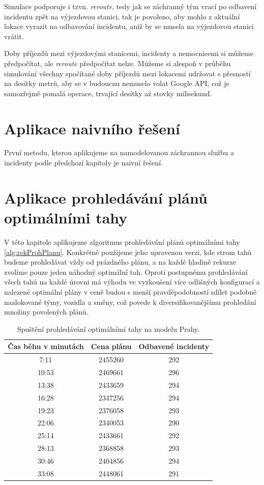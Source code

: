 Simulace podporuje i tzvn. \textit{reroute}, tedy jak se záchranný tým vrací po odbavení incidentu zpět na výjezdovou stanici,
tak je povoleno, aby mohlo z aktuální lokace vyrazit na odbavování incidentu, aniž by se musela na výjezdovou stanici vrátit.

Doby příjezdů mezi výjezdovými stanicemi, incidenty a nemocnicemi si můžeme předpočítat, ale \textit{reroute} předpočítat nelze.
Můžeme si alespoň v průběhu simulování všechny spočítané doby příjezdů mezi lokacemi udržovat s přesností na desítky metrů,
aby se v budoucnu nemuselo volat Google API, což je samozřejmě pomalá operace, trvající desítky až stovky milisekund. 

\section{Aplikace naivního řešení}

První metodu, kterou aplikujeme na namodelovanou záchrannou službu a incidenty podle předchozí kapitoly je naivní řešení.

\section{Aplikace prohledávání plánů optimálními \linebreak tahy}

V této kapitole aplikujeme algoritmus prohledávání plánů optimálními tahy \ref{alg:rekProhPlanu}.
Konkrétně použijeme jeho upravenou verzi, kde strom tahů budeme prohledávat vždy od prázdného plánu, a na každé hladině rekurze zvolíme pouze jeden náhodný optimální tah.
Oproti postupnému prohledávání všech tahů na každé úrovni má výhodu ve vyzkoušení více odlišných konfigurací a nalezené optimální plány v ceně budou s menší pravděpodobností sdílet
podobně naalokované týmy, vozidla a směny, což povede k diversifikovanějšímu prohledání množiny povolených plánů.

\begin{table}[h!]
\centering
\begin{tabular}{|c|c|c|}
\hline
\textbf{Čas běhu v minutách} & \textbf{Cena plánu} & \textbf{Odbavené incidenty} \\
\hline
7:11 & 2455260 & 292 \\
\hline
10:53 & 2469661 & 296 \\
\hline
13:38 & 2433659 & 294 \\
\hline
16:28 & 2347256 & 294 \\
\hline
19:23 & 2376058 & 293 \\
\hline
22:06 & 2340053 & 290 \\
\hline
25:14 & 2433661 & 292 \\
\hline
28:13 & 2368858 & 293 \\
\hline
30:46 & 2404856 & 294 \\
\hline
33:08 & 2448061 & 291 \\
\hline
\end{tabular}
\caption{Spuštění prohledávání optimálními tahy na modelu Prahy.}
\label{table:optimalMovesTabulka}
\end{table}


